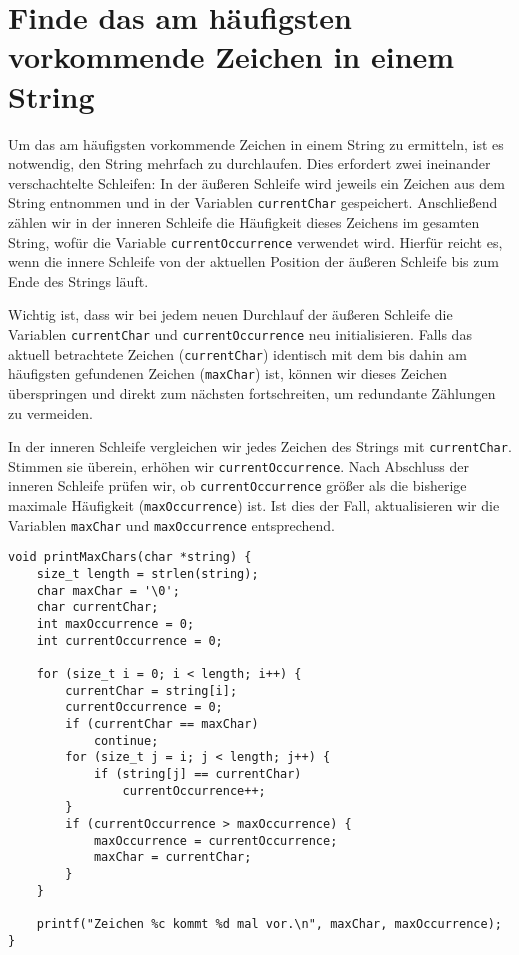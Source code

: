 \chapter{Finde das am häufigsten vorkommende Zeichen in einem String}

Um das am häufigsten vorkommende Zeichen in einem String zu ermitteln, ist es
notwendig, den String mehrfach zu durchlaufen. Dies erfordert zwei ineinander
verschachtelte Schleifen: In der äußeren Schleife wird jeweils ein Zeichen aus
dem String entnommen und in der Variablen \texttt{currentChar}
gespeichert. Anschließend zählen wir in der inneren Schleife die Häufigkeit
dieses Zeichens im gesamten String, wofür die Variable
\texttt{currentOccurrence} verwendet wird. Hierfür reicht es, wenn die
innere Schleife von der aktuellen Position der äußeren Schleife bis zum Ende des
Strings läuft.

Wichtig ist, dass wir bei jedem neuen Durchlauf der äußeren Schleife die
Variablen \texttt{currentChar} und \texttt{currentOccurrence} neu
initialisieren. Falls das aktuell betrachtete Zeichen
(\texttt{currentChar}) identisch mit dem bis dahin am häufigsten
gefundenen Zeichen (\texttt{maxChar}) ist, können wir dieses Zeichen
überspringen und direkt zum nächsten fortschreiten, um redundante Zählungen zu
vermeiden.

In der inneren Schleife vergleichen wir jedes Zeichen des Strings mit
\texttt{currentChar}. Stimmen sie überein, erhöhen wir
\texttt{currentOccurrence}. Nach Abschluss der inneren Schleife prüfen
wir, ob \texttt{currentOccurrence} größer als die bisherige maximale
Häufigkeit (\texttt{maxOccurrence}) ist. Ist dies der Fall, aktualisieren
wir die Variablen \texttt{maxChar} und \texttt{maxOccurrence}
entsprechend.

\begin{verbatim}
void printMaxChars(char *string) {
    size_t length = strlen(string);
    char maxChar = '\0';
    char currentChar;
    int maxOccurrence = 0;
    int currentOccurrence = 0;

    for (size_t i = 0; i < length; i++) {
        currentChar = string[i];
        currentOccurrence = 0;
        if (currentChar == maxChar)
            continue;
        for (size_t j = i; j < length; j++) {
            if (string[j] == currentChar)
                currentOccurrence++;
        }
        if (currentOccurrence > maxOccurrence) {
            maxOccurrence = currentOccurrence;
            maxChar = currentChar;
        }
    }

    printf("Zeichen %c kommt %d mal vor.\n", maxChar, maxOccurrence);
}
\end{verbatim}






